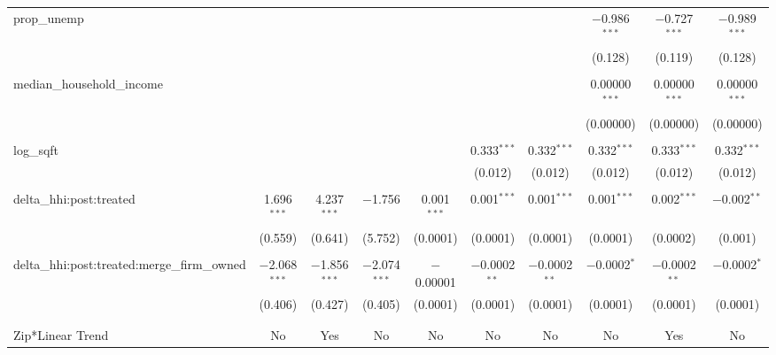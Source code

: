 \begin{table}[H]
{\begin{tabular}{@{\extracolsep{5pt}}lccccccccc}
  prop\_unemp &  &  &  &  &  &  & $-$0.986$^{***}$ & $-$0.727$^{***}$ & $-$0.989$^{***}$ \\  

   &  &  &  &  &  &  & (0.128) & (0.119) & (0.128) \\  

   & & & & & & & & & \\  

  median\_household\_income &  &  &  &  &  &  & 0.00000$^{***}$ & 0.00000$^{***}$ & 0.00000$^{***}$ \\  

   &  &  &  &  &  &  & (0.00000) & (0.00000) & (0.00000) \\  

   & & & & & & & & & \\  

  log\_sqft &  &  &  &  & 0.333$^{***}$ & 0.332$^{***}$ & 0.332$^{***}$ & 0.333$^{***}$ & 0.332$^{***}$ \\  

   &  &  &  &  & (0.012) & (0.012) & (0.012) & (0.012) & (0.012) \\  

   & & & & & & & & & \\  

  delta\_hhi:post:treated & 1.696$^{***}$ & 4.237$^{***}$ & $-$1.756 & 0.001$^{***}$ & 0.001$^{***}$ & 0.001$^{***}$ & 0.001$^{***}$ & 0.002$^{***}$ & $-$0.002$^{**}$ \\  

   & (0.559) & (0.641) & (5.752) & (0.0001) & (0.0001) & (0.0001) & (0.0001) & (0.0002) & (0.001) \\  

   & & & & & & & & & \\  

  delta\_hhi:post:treated:merge\_firm\_owned & $-$2.068$^{***}$ & $-$1.856$^{***}$ & $-$2.074$^{***}$ & $-$0.00001 & $-$0.0002$^{**}$ & $-$0.0002$^{**}$ & $-$0.0002$^{*}$ & $-$0.0002$^{**}$ & $-$0.0002$^{*}$ \\  

   & (0.406) & (0.427) & (0.405) & (0.0001) & (0.0001) & (0.0001) & (0.0001) & (0.0001) & (0.0001) \\  

   & & & & & & & & & \\  

 \hline \\[-1.8ex]  

 Zip*Linear Trend & No & Yes & No & No & No & No & No & Yes & No \\  


\end{tabular}}
\end{table}
